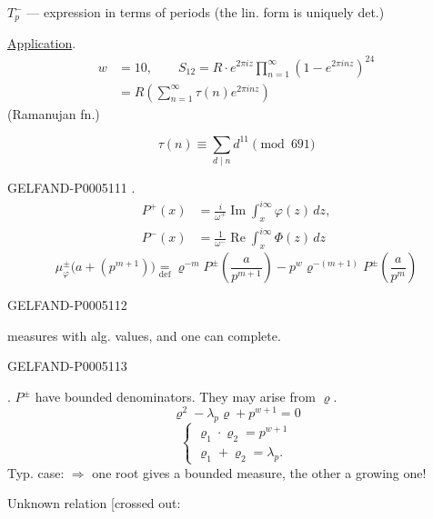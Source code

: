 $T_p^-$ — expression in terms of periods (the lin. form is uniquely det.)

\uline{Application}.
\[
\begin{aligned}
w&=10,\qquad S_{12}=R\cdot e^{2\pi iz}
 \prod_{n=1}^\infty(1-e^{2\pi inz})^{24}\\
 &=R\left(\sum_{n=1}^\infty\tau(n)e^{2\pi inz}\right)
\end{aligned}
\]
\hfill (Ramanujan fn.)\par

\[
\tau(n)\equiv\sum_{d\mid n}d^{11}\pmod{691}
\]


\begin{GelfandAdjacentEvidence}{GELFAND-P000511}{1}
.
\[
\begin{aligned}
P^+(x)&=\frac{i}{\omega^+}\operatorname{Im}\int_x^{i\infty}\varphi(z)\,dz,\\
P^-(x)&=\frac{1}{\omega^-}\operatorname{Re}\int_x^{i\infty}\Phi(z)\,dz
\end{aligned}
\]
\[
\mu_\varphi^\pm\bigl(a+(p^{m+1})\bigr)
\underset{\mathrm{def}}{=}
\varrho^{-m}P^\pm\left(\frac{a}{p^{m+1}}\right)
-p^w\varrho^{-(m+1)}P^\pm\left(\frac{a}{p^m}\right)
\]
\end{GelfandAdjacentEvidence}
\begin{GelfandAdjacentEvidence}{GELFAND-P000511}{2}

measures with alg. values, and one can complete.
\end{GelfandAdjacentEvidence}
\begin{GelfandAdjacentEvidence}{GELFAND-P000511}{3}


. $P^\pm$ have bounded denominators.
They may arise from $\varrho$.
\[
\varrho^2-\lambda_p\varrho+p^{w+1}=0
\]
\[
\begin{cases}
\varrho_1\cdot\varrho_2=p^{w+1}\\
\varrho_1+\varrho_2=\lambda_p.
\end{cases}
\]
Typ. case: 
$\Rightarrow$ one root gives a bounded measure, the other a growing one!

Unknown relation [crossed out:
\end{GelfandAdjacentEvidence}
